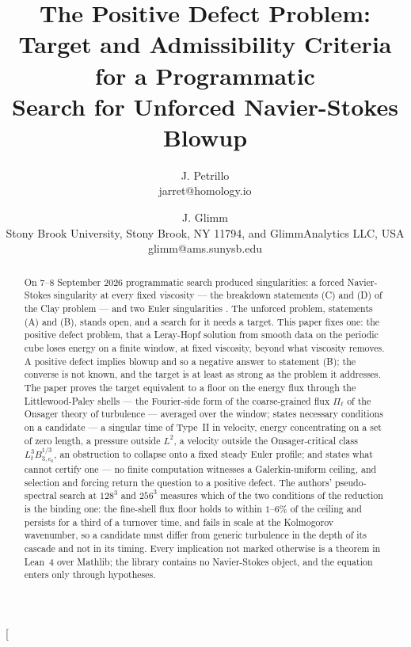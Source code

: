 \documentclass[letterpaper,twocolumn]{article}
\begin{document}
\twocolumn[

\title{The Positive Defect Problem:
\\ Target and Admissibility Criteria for a Programmatic
\\ Search for Unforced Navier-Stokes Blowup}

\author{J. Petrillo \\
jarret@homology.io
\and
J. Glimm \\
Stony Brook University, Stony Brook, NY 11794,
and GlimmAnalytics LLC, USA  \\
glimm@ams.sunysb.edu }

\maketitle

\let\oldclearpage\clearpage
\renewcommand{\clearpage}{}

\begin{@twocolumnfalse}

\begin{abstract}
On 7--8 September 2026 programmatic search produced singularities: a
forced Navier-Stokes singularity at every fixed viscosity --- the
breakdown statements (C) and (D) of the Clay problem --- and two Euler
singularities \cite{OpenAI26NS,OpenAI26Euler,AlpBuc26}. The unforced
problem, statements (A) and (B), stands open, and a search for it needs a
target. This paper fixes one: the positive defect problem, that a
Leray-Hopf solution from smooth data on the periodic cube loses energy on
a finite window, at fixed viscosity, beyond what viscosity removes. A
positive defect implies blowup and so a negative answer to statement (B);
the converse is not known, and the target is at least as strong as the
problem it addresses. The paper proves the target equivalent to a floor on
the energy flux through the Littlewood-Paley shells --- the Fourier-side
form of the coarse-grained flux $\Pi_\ell$ of the Onsager theory of
turbulence --- averaged over the window; states
necessary conditions on a candidate --- a singular time of Type~II in
velocity, energy concentrating on a set of zero length, a pressure outside
$L^2$, a velocity outside the Onsager-critical class $L^3_t
B^{1/3}_{3,c_0}$, an obstruction to collapse onto a fixed steady Euler
profile; and
states what cannot certify one
--- no finite computation witnesses a Galerkin-uniform ceiling, and
selection and forcing return the question to a positive defect. The
authors' pseudo-spectral search at $128^3$ and $256^3$ measures which of
the two conditions of the reduction is the binding one: the fine-shell flux
floor holds to within $1$--$6\%$ of the ceiling and persists for a third
of a turnover time, and fails in scale at the Kolmogorov wavenumber, so a
candidate must differ from generic turbulence in the depth of its cascade
and not in its timing. Every implication not marked otherwise is a theorem in Lean~4 over Mathlib; the
library contains no Navier-Stokes object, and the equation enters only
through hypotheses.
\end{abstract}
\end{@twocolumnfalse}
\end{document}
